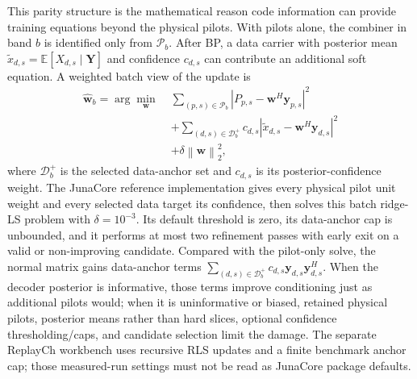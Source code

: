 \documentclass[journal]{IEEEtran}
\newcommand{\Ht}{^{H}}
\newcommand{\norm}[1]{\left\lVert #1 \right\rVert}
\newcommand{\abs}[1]{\left\lvert #1 \right\rvert}
\begin{document}
This parity structure is the mathematical reason code information can provide
training equations beyond the physical pilots. With pilots alone, the combiner in
band $b$ is identified only from $\mathcal P_b$. After BP, a data carrier with
posterior mean $\widetilde x_{d,s}=\mathbb E[X_{d,s}\mid\mathbf Y]$ and
confidence $c_{d,s}$ can contribute an additional soft equation. A weighted batch
view of the update is
\begin{equation}
  \begin{aligned}
  \widehat{\mathbf w}_b
  =\arg\min_{\mathbf w}\;&
  \sum_{(p,s)\in\mathcal P_b}
      \abs{P_{p,s}-\mathbf w\Ht\mathbf y_{p,s}}^2\\
  &+\sum_{(d,s)\in\mathcal D_b^+}c_{d,s}
      \abs{\widetilde x_{d,s}-\mathbf w\Ht\mathbf y_{d,s}}^2\\
  &+\delta\norm{\mathbf w}_2^2 ,
  \end{aligned}
  \label{eq:soft-pilot-ls}
\end{equation}
where $\mathcal D_b^+$ is the selected data-anchor set and $c_{d,s}$ is its
posterior-confidence weight. The JunaCore reference implementation gives every
physical pilot unit weight and every selected data target its confidence, then
solves this batch ridge-LS problem with $\delta=10^{-3}$. Its default threshold
is zero, its data-anchor cap is unbounded, and it performs at most two refinement
passes with early exit on a valid or non-improving candidate. Compared with the
pilot-only solve, the normal matrix gains data-anchor terms
$\sum_{(d,s)\in\mathcal D_b^+}c_{d,s}\mathbf y_{d,s}\mathbf y_{d,s}\Ht$.
When the decoder posterior is informative, those terms improve conditioning just
as additional pilots would; when it is uninformative or biased, retained physical
pilots, posterior means rather than hard slices, optional confidence
thresholding/caps, and candidate selection limit the damage. The separate
ReplayCh workbench uses recursive RLS updates and a finite benchmark anchor cap;
those measured-run settings must not be read as JunaCore package defaults.
\end{document}
